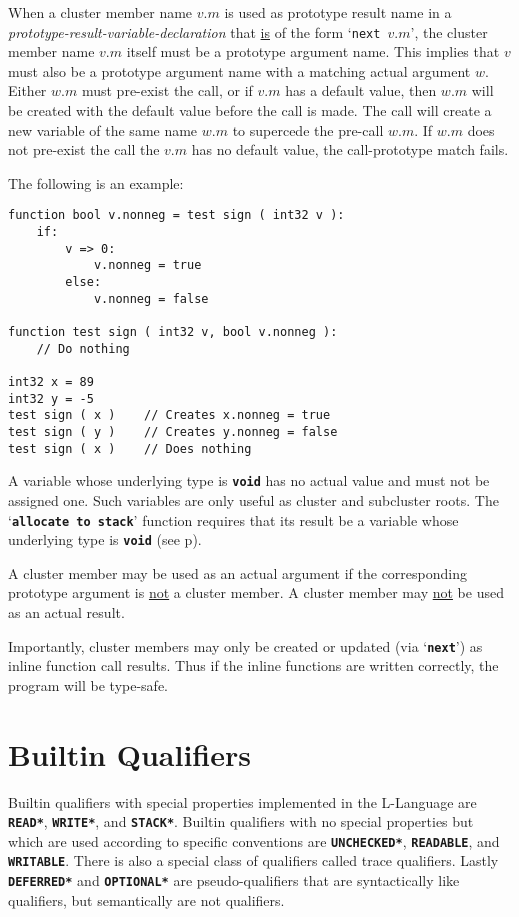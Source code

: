 \documentclass[12pt]{article}
\newcommand{\TT}[1]{{\tt \bfseries #1}}
\newcommand{\pagref}[1]{p\pageref{#1}}
\newenvironment{indpar}[1][0.3in]%
	{\begin{list}{}%
		     {\setlength{\itemsep}{0in}%
		      \setlength{\topsep}{0in}%
		      \setlength{\parsep}{1ex}%
		      \setlength{\labelwidth}{#1}%
		      \setlength{\leftmargin}{#1}%
		      \addtolength{\leftmargin}{\labelsep}}%
	 \item}%
	{\end{list}}
\begin{document}
When a cluster member name $v.m$ is used as prototype result name in
a {\em prototype-result-variable-declaration} that \underline{is}
of the form `{\tt next $v.m$}', the cluster member name $v.m$ itself
must be a prototype argument name.  This implies that $v$ must also
be a prototype argument name with a matching actual argument $w$.
Either $w.m$ must pre-exist the call, or if $v.m$ has a default
value, then $w.m$ will be created with the default value before
the call is made.  The call will create a new variable of the
same name $w.m$ to supercede the pre-call $w.m$.
If $w.m$ does not pre-exist the call the $v.m$ has no default
value, the call-prototype match fails.

The following is an example:
\begin{indpar}\begin{verbatim}
function bool v.nonneg = test sign ( int32 v ):
    if:
        v => 0:
            v.nonneg = true
        else:
            v.nonneg = false

function test sign ( int32 v, bool v.nonneg ):
    // Do nothing

int32 x = 89
int32 y = -5
test sign ( x )    // Creates x.nonneg = true
test sign ( y )    // Creates y.nonneg = false
test sign ( x )    // Does nothing
\end{verbatim}\end{indpar}

A variable whose underlying type is \TT{void} has no actual value
and must not be assigned one.  Such variables are only useful
as cluster and subcluster roots.  The `\TT{allocate to stack}'
function requires that its result be a variable whose underlying
type is \TT{void} (see \pagref{ALLOCATE-TO-STACK}).

A cluster member may be used as an actual argument if
the corresponding prototype argument is
\underline{not} a cluster member.  A cluster member may \underline{not}
be used as an actual result.

Importantly, cluster members may only be created or updated
(via `\TT{next}')
as inline function call results.  Thus if
the inline functions are written correctly, the program will be type-safe.

\section{Builtin Qualifiers}
\label{BUILTIN-QUALIFIERS}

Builtin qualifiers with special properties implemented in the L-Language
are \TT{*READ*}, \TT{*WRITE*}, and \TT{*STACK*}.
Builtin qualifiers with no special properties but which are used
according to specific conventions are \TT{*UNCHECKED*}, \TT{*READABLE},
and \TT{*WRITABLE}.
There is also a special class of qualifiers called trace qualifiers.
Lastly \TT{*DEFERRED*} and \TT{*OPTIONAL*} are pseudo-qualifiers that are
syntactically like qualifiers, but semantically are not qualifiers.
\end{document}
